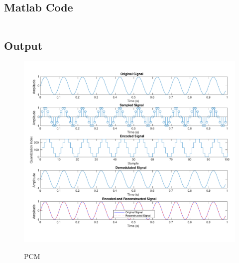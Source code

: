 \subsection{Matlab Code}

\inputminted[fontsize=\footnotesize,autogobble]{matlab}{code/pcm.m}

\subsection{Output}

\begin{figure}[!htb]
      \centering
      \includegraphics[width=.9\textwidth]{res/figures/pcm_no_quantization.pdf}
      \label{output:pcm}
      \caption{PCM}
\end{figure}
